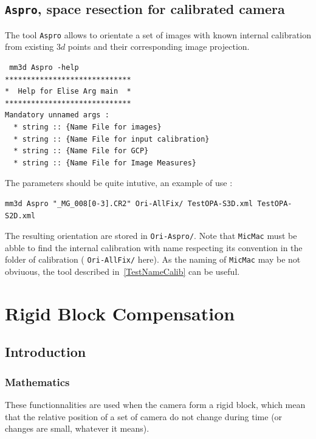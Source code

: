 \subsection{{\tt Aspro}, space resection for calibrated camera}


The tool {\tt Aspro} allows to orientate a set of images with known internal calibration
 from existing $3d$ points and their corresponding image projection.

\begin{verbatim}
 mm3d Aspro -help
*****************************
*  Help for Elise Arg main  *
*****************************
Mandatory unnamed args : 
  * string :: {Name File for images}
  * string :: {Name File for input calibration}
  * string :: {Name File for GCP}
  * string :: {Name File for Image Measures}
\end{verbatim}

The parameters should be quite intutive, an example of use :

\begin{verbatim}
mm3d Aspro "_MG_008[0-3].CR2" Ori-AllFix/ TestOPA-S3D.xml TestOPA-S2D.xml 
\end{verbatim}

The resulting orientation are stored in {\tt Ori-Aspro/}. Note that {\tt MicMac} must be abble
to find the internal calibration with name respecting its convention in the folder of calibration
( {\tt Ori-AllFix/}  here). As the naming of {\tt MicMac} may be not obviuous, the tool 
described in~\ref{TestNameCalib} can be useful.

\section{Rigid Block Compensation}

\subsection{Introduction}

\subsubsection{Mathematics}

These functionnalities are used when the camera form a rigid block, which mean that the relative position
of a set of camera do not change during time (or changes are small, whatever it means).

